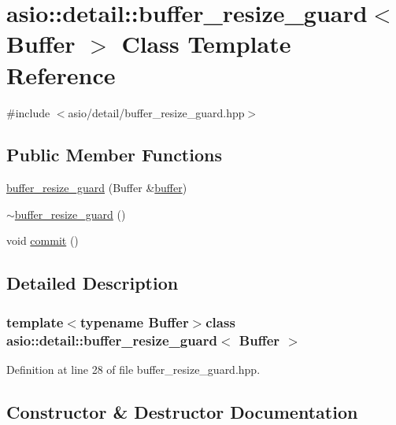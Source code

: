 \hypertarget{classasio_1_1detail_1_1buffer__resize__guard}{}\section{asio\+:\+:detail\+:\+:buffer\+\_\+resize\+\_\+guard$<$ Buffer $>$ Class Template Reference}
\label{classasio_1_1detail_1_1buffer__resize__guard}


{\ttfamily \#include $<$asio/detail/buffer\+\_\+resize\+\_\+guard.\+hpp$>$}

\subsection*{Public Member Functions}
\begin{DoxyCompactItemize}
\item 
\hyperlink{classasio_1_1detail_1_1buffer__resize__guard_a75c19d8c4321ce665abd5c4964d4e42d}{buffer\+\_\+resize\+\_\+guard} (Buffer \&\hyperlink{group__buffer_ga1ed66e401559cbfd19595392f653b47c}{buffer})
\item 
\hyperlink{classasio_1_1detail_1_1buffer__resize__guard_a52be66e6bab81f3efd9fc3c1b6b5fcae}{$\sim$buffer\+\_\+resize\+\_\+guard} ()
\item 
void \hyperlink{classasio_1_1detail_1_1buffer__resize__guard_a10b8194b6b31a72f2b9a40582c016a77}{commit} ()
\end{DoxyCompactItemize}


\subsection{Detailed Description}
\subsubsection*{template$<$typename Buffer$>$class asio\+::detail\+::buffer\+\_\+resize\+\_\+guard$<$ Buffer $>$}



Definition at line 28 of file buffer\+\_\+resize\+\_\+guard.\+hpp.



\subsection{Constructor \& Destructor Documentation}
\hypertarget{classasio_1_1detail_1_1buffer__resize__guard_a75c19d8c4321ce665abd5c4964d4e42d}{}
